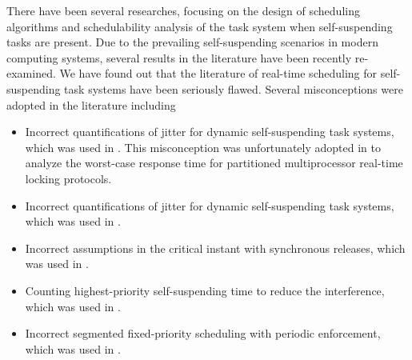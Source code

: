 There have been several researches, focusing on the design of scheduling algorithms and schedulability analysis of the task system when self-suspending tasks are present. Due to the prevailing self-suspending scenarios in modern computing systems, several results in the literature have been recently re-examined. We have found out that the literature of real-time scheduling for self-suspending task systems have been seriously flawed. Several misconceptions were adopted in the literature including 
\begin{itemize}
\item Incorrect quantifications of jitter for dynamic self-suspending
  task systems, which was used in
  \cite{ECRTS-AudsleyB04,RTAS-AudsleyB04,RTCSA-KimCPKH95}.  This
  misconception was unfortunately adopted in \cite{zeng-2011,bbb-2013,yang-2013,kim-2014,han-2014,carminati-2014,yang-2014,lakshmanan-2009} to analyze the worst-case response time for
  partitioned multiprocessor real-time locking protocols.
\item Incorrect quantifications of jitter for dynamic self-suspending
  task systems, which was used in  \cite{RTCSA-BletsasA05}.
\item Incorrect assumptions in the critical instant with
  synchronous releases, which was used in \cite{LR:rtas10}.
\item Counting highest-priority self-suspending time to reduce the
  interference, which was used in  \cite{RTSS-KimANR13}. 
\item Incorrect segmented fixed-priority scheduling with periodic
  enforcement, which was used in \cite{RTSS-KimANR13,DBLP:journals/ieicet/DingTT09}.
\end{itemize}

